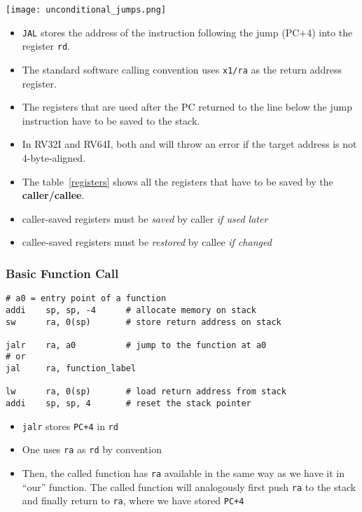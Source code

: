 \texttt{[image: unconditional\_jumps.png]}
\begin{itemize}
    \item \texttt{JAL} stores the address of the instruction following the jump (PC+4) into the register \texttt{rd}.
    \item The standard software calling convention uses \texttt{x1/ra} as the return address register.
    \item The registers that are used after the PC returned to the line below the jump instruction have to be saved to the stack.
    \item In RV32I and RV64I, both  and  will throw an error if the target address is not 4-byte-aligned.
    \item The table~\ref{registers} shows all the registers that have to be saved by the \textbf{caller/callee}.
    \item caller-saved registers must be \textit{saved} by caller \textit{if used later}
    \item callee-saved registers must be \textit{restored} by callee \textit{if changed}
\end{itemize}


\subsubsection{Basic Function Call}

\begin{lstlisting}[language={[RISC-V]Assembler}]
# a0 = entry point of a function 
addi    sp, sp, -4      # allocate memory on stack
sw      ra, 0(sp)       # store return address on stack

jalr    ra, a0          # jump to the function at a0
# or
jal     ra, function_label

lw      ra, 0(sp)       # load return address from stack 
addi    sp, sp, 4       # reset the stack pointer
\end{lstlisting}

\begin{itemize}
    \item \texttt{jalr} stores \texttt{PC+4} in \texttt{rd}
    \item One uses \texttt{ra} as \texttt{rd} by convention
    \item Then, the called function has \texttt{ra} available in the same way as we have it in ``our'' function. The called function will analogously first push \texttt{ra} to the stack and finally return to \texttt{ra}, where we have stored \texttt{PC+4}
\end{itemize}

